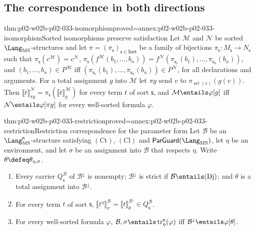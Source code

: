 \subsection{The correspondence in both directions}
\label{sec:p02-w02b-p02-033-correspondence}

\begin{hblemma}{thm:p02-w02b-p02-033-isomorphism}{proved=annex:p02-w02b-p02-033-isomorphism}{Sorted isomorphisms preserve satisfaction}
Let \(\mathcal M\) and \(\mathcal N\) be sorted
\(\Lang_{\mathrm{MS}}\)-structures and let
\(\pi=(\pi_{\mathsf s})_{\mathsf s\in\mathsf{Sort}}\) be a family of
bijections \(\pi_{\mathsf s}:M_{\mathsf s}\to N_{\mathsf s}\) such that
\(\pi_{\mathsf s}(c^{\mathcal M})=c^{\mathcal N}\),
\(\pi_{\mathsf s}(f^{\mathcal M}(b_1,\ldots,b_n))=
f^{\mathcal N}(\pi_{\mathsf s_1}(b_1),\ldots,\pi_{\mathsf s_n}(b_n))\), and
\((b_1,\ldots,b_n)\in P^{\mathcal M}\) iff
\((\pi_{\mathsf s_1}(b_1),\ldots,\pi_{\mathsf s_n}(b_n))\in P^{\mathcal N}\),
for all declarations and arguments.  For a total assignment \(g\) into
\(\mathcal M\) let \(\pi g\) send \(v\) to
\(\pi_{\operatorname{srt}(v)}(g(v))\).  Then
\(\llbracket t\rrbracket^{\mathcal N}_{\pi g}=
\pi_{\mathsf s}(\llbracket t\rrbracket^{\mathcal M}_{g})\) for every term
\(t\) of sort \(\mathsf s\), and \(\mathcal M\entails\varphi[g]\) iff
\(\mathcal N\entails\varphi[\pi g]\) for every well-sorted formula
\(\varphi\).
\end{hblemma}

\begin{hbtheorem}{thm:p02-w02b-p02-033-restriction}{proved=annex:p02-w02b-p02-033-restriction}{Restriction correspondence for the parameter form}
Let \(\mathcal B\) be an \(\Lang_{\mathrm{MS}}^{\mathsf n}\)-structure
satisfying \((\mathrm{Ct})\), \((\mathrm{Cl})\) and
\(\mathsf{ParGuard}(\Lang_{\mathrm{MS}})\), let \(\eta\) be an environment, and
let \(\sigma\) be an assignment into \(\mathcal B\) that respects \(\eta\).
Write \(\theta\defeq\theta_{\eta,\sigma}\).
\begin{enumerate}
\item Every carrier \(Q_{\mathsf s}^{\mathcal B}\) of
      \(\mathcal B^{\downarrow}\) is nonempty; \(\mathcal B^{\downarrow}\) is
      strict if \(\mathcal B\entails(\mathrm{Dj})\); and \(\theta\) is a
      total assignment into \(\mathcal B^{\downarrow}\).
\item For every term \(t\) of sort \(\mathsf s\),
      \(\llbracket t^{\eta}\rrbracket^{\mathcal B}_{\sigma}=
      \llbracket t\rrbracket^{\mathcal B^{\downarrow}}_{\theta}\in
      Q_{\mathsf s}^{\mathcal B}\).
\item For every well-sorted formula \(\varphi\),
      \(\mathcal B,\sigma\entails\operatorname{tr}^{\mathsf n}_{\eta}(\varphi)\)
      iff \(\mathcal B^{\downarrow}\entails\varphi[\theta]\).
\end{enumerate}
\end{hbtheorem}

